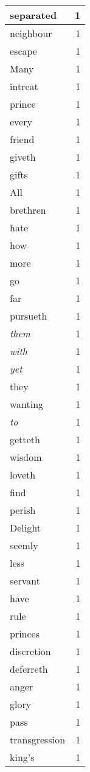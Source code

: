 \begin{center}
\begin{longtable}{l|r}
separated & 1\\ \hline 
neighbour & 1\\ \hline 
escape & 1\\ \hline 
Many & 1\\ \hline 
intreat & 1\\ \hline 
prince & 1\\ \hline 
every & 1\\ \hline 
friend & 1\\ \hline 
giveth & 1\\ \hline 
gifts & 1\\ \hline 
All & 1\\ \hline 
brethren & 1\\ \hline 
hate & 1\\ \hline 
how & 1\\ \hline 
more & 1\\ \hline 
go & 1\\ \hline 
far & 1\\ \hline 
pursueth & 1\\ \hline 
\emph{them} & 1\\ \hline 
\emph{with} & 1\\ \hline 
\emph{yet} & 1\\ \hline 
they & 1\\ \hline 
wanting & 1\\ \hline 
\emph{to} & 1\\ \hline 
getteth & 1\\ \hline 
wisdom & 1\\ \hline 
loveth & 1\\ \hline 
find & 1\\ \hline 
perish & 1\\ \hline 
Delight & 1\\ \hline 
seemly & 1\\ \hline 
less & 1\\ \hline 
servant & 1\\ \hline 
have & 1\\ \hline 
rule & 1\\ \hline 
princes & 1\\ \hline 
discretion & 1\\ \hline 
deferreth & 1\\ \hline 
anger & 1\\ \hline 
glory & 1\\ \hline 
pass & 1\\ \hline 
transgression & 1\\ \hline 
king's & 1\\ \hline 

\end{longtable}
\end{center}
